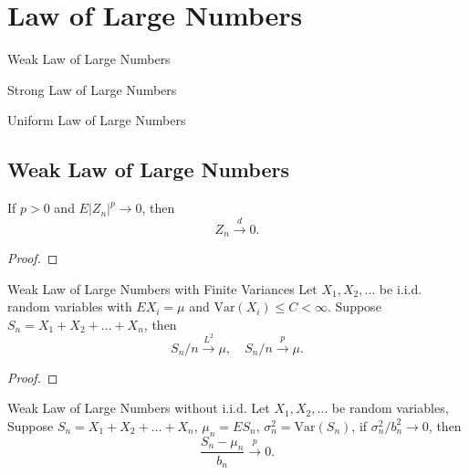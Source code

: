 \chapter{Law of Large Numbers}

\begin{introduction}
    \item Weak Law of Large Numbers
    \item Strong Law of Large Numbers
    \item Uniform Law of Large Numbers
\end{introduction}

\section{Weak Law of Large Numbers}

\begin{lemma}{}{}
    If $p>0$ and $E\left|Z_{n}\right|^{p}\rightarrow 0$, then
    \begin{equation}
        Z_{n}\stackrel{d}{\rightarrow}0.
    \end{equation}
\end{lemma}

\begin{proof}
    
\end{proof}

\begin{theorem}{Weak Law of Large Numbers with Finite Variances}{}
    Let $X_1,X_2,\ldots$ be i.i.d. random variables with $EX_i=\mu$ and $\text{Var}(X_i)\leq C<\infty$. Suppose $S_n=X_1+X_2+\ldots+X_n$, then
    \begin{equation}
        S_n/n\stackrel{L^2}{\rightarrow}\mu,\quad S_n/n\stackrel{p}{\rightarrow}\mu.
    \end{equation}
\end{theorem}

\begin{proof}
    
\end{proof}

\begin{theorem}{Weak Law of Large Numbers without i.i.d.}{}
    Let $X_1,X_2,\ldots$ be random variables, Suppose $S_n=X_1+X_2+\ldots+X_n$, $\mu_n=ES_n$, $\sigma_n^2=\text{Var}(S_n)$, if $\sigma_n^2/b_n^2\rightarrow 0$, then
    \begin{equation}
        \frac{S_n-\mu_n}{b_n}\stackrel{p}{\rightarrow}0.
    \end{equation}
\end{theorem}

